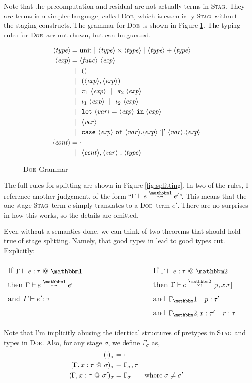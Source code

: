 \documentclass[11pt]{article}
\makeatletter
\newcommand {\type} {\langle\mathit{type}\rangle}
\newcommand {\expr} {\langle\mathit{exp}\rangle}
\newcommand {\var} {\langle\mathit{var}\rangle}
\newcommand {\context} {\langle\mathit{cont}\rangle}
\newcommand {\gbar} {~~|~~}
\newcommand {\bbone} {\mathbbm 1}
\newcommand {\bbtwo} {\mathbbm 2}
\newcommand {\at} {{\tt~@~}}
\newcommand {\letin} [3] {{\tt let}~{#1} = {#2}~{\tt in}~{#3}}
\newcommand {\translates} {\overset{\bbone}\rightsquigarrow}
\newcommand {\splits} {\overset{\bbtwo}\rightsquigarrow}
\newcommand {\wstage} {\textsc{Stag}}
\newcommand {\wostage} {\textsc{Doe}}
\makeatother
\begin{document}
Note that the precomputation and residual are not actually terms in \wstage.  They are terms in a simpler language, called \wostage, which is essentially \wstage~without the staging constructs.  The grammar for \wostage~is shown in Figure \ref{fig:gram2}.  The typing rules for \wostage~are not shown, but can be guessed.

\begin{figure}
\caption{\wostage~Grammar}
\label{fig:gram2}
\centering
\begin{align*}
\type &= \text{unit}~|~\type \times \type~|~\type + \type \\
\expr &= \langle\mathit{func}\rangle~\expr \\
&\gbar () \\
&\gbar (\expr, \expr) \\
&\gbar \pi_1~\expr 
\gbar \pi_2~\expr \\
&\gbar \iota_1~\expr 
\gbar \iota_2~\expr \\
&\gbar \letin {\var}{\expr}{\expr} \\
&\gbar \var \\
&\gbar {\tt case}~\expr~{\tt of}~\var.\expr~`{\tt |}\text{'}~\var.\expr \\
\context &= \cdot \\
&\gbar \context, \var : \type
\end{align*}
\end{figure}

The full rules for splitting are shown in Figure \ref{fig:splitting}.  In two of the rules, I reference another judgement, of the form ``$\Gamma \vdash e \translates e'$''.  This means that the one-stage \wstage~term $e$ simply translates to a \wostage~term $e'$.  There are no surprises in how this works, so the details are omitted.

Even without a semantics done, we can think of two theorems that should hold true of stage splitting.  Namely, that good types in lead to good types out.  Explicitly:

\begin{center}
\begin{tabular}{lll}
If $\Gamma \vdash e:\tau \at \bbone$ &~~~~~~~~~~~~~~ & If $\Gamma \vdash e:\tau \at \bbtwo$ \\
then $\Gamma \vdash e \translates e'$ && then $\Gamma \vdash e \splits [p,x.r]$ \\
and $\Gamma \vdash e':\tau$ && and $\Gamma_\bbone \vdash p:\tau'$\\
 && and $\Gamma_\bbtwo, x:\tau' \vdash r:\tau$
\end{tabular}
\end{center}
Note that I'm implicitly abusing the identical structures of pretypes in \wstage~and types in \wostage.  Also, for any stage $\sigma$, we define $\Gamma_\sigma$ as,
\begin{align}
(\cdot)_\sigma &= \cdot \\
(\Gamma,x:\tau\at\sigma)_\sigma &= \Gamma_\sigma, \tau \\
(\Gamma,x:\tau\at\sigma')_\sigma &= \Gamma_\sigma &\text{where } \sigma \not= \sigma'
\end{align}
\end{document}
